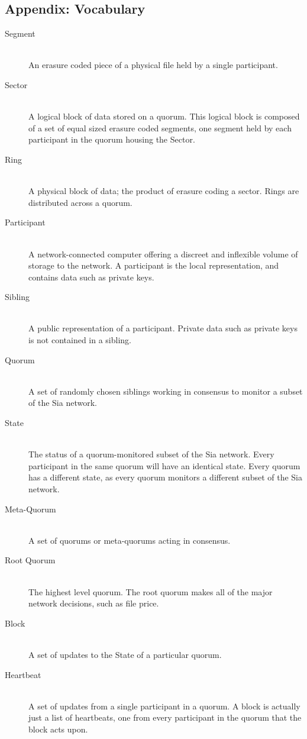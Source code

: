 \documentclass[twocolumn]{article}
\begin{document}
\subsection*{Appendix: Vocabulary}
\begin{description}
	\item[Segment] \hfill \\
	An erasure coded piece of a physical file held by a single participant.
	\item[Sector] \hfill \\
	A logical block of data stored on a quorum.
	This logical block is composed of a set of equal sized erasure coded segments, one segment held by each participant in the quorum housing the Sector.
	\item[Ring] \hfill \\
	A physical block of data; the product of erasure coding a sector.
	Rings are distributed across a quorum.
	
	\item[Participant] \hfill \\
	A network-connected computer offering a discreet and inflexible volume of storage to the network.
	A participant is the local representation, and contains data such as private keys.
	\item[Sibling] \hfill \\
	A public representation of a participant.
	Private data such as private keys is not contained in a sibling.
	\item[Quorum] \hfill \\
	A set of randomly chosen siblings working in consensus to monitor a subset of the Sia network.
	\item[State] \hfill \\
	The status of a quorum-monitored subset of the Sia network.
	Every participant in the same quorum will have an identical state.
	Every quorum has a different state, as every quorum monitors a different subset of the Sia network.
	\item[Meta-Quorum] \hfill \\
	A set of quorums or meta-quorums acting in consensus.
	\item[Root Quorum] \hfill \\
	The highest level quorum.
	The root quorum makes all of the major network decisions, such as file price.

	\item[Block] \hfill \\
	A set of updates to the State of a particular quorum.
	\item[Heartbeat] \hfill \\
	A set of updates from a single participant in a quorum.
	A block is actually just a list of heartbeats, one from every participant in the quorum that the block acts upon.
\end{description}
\end{document}

